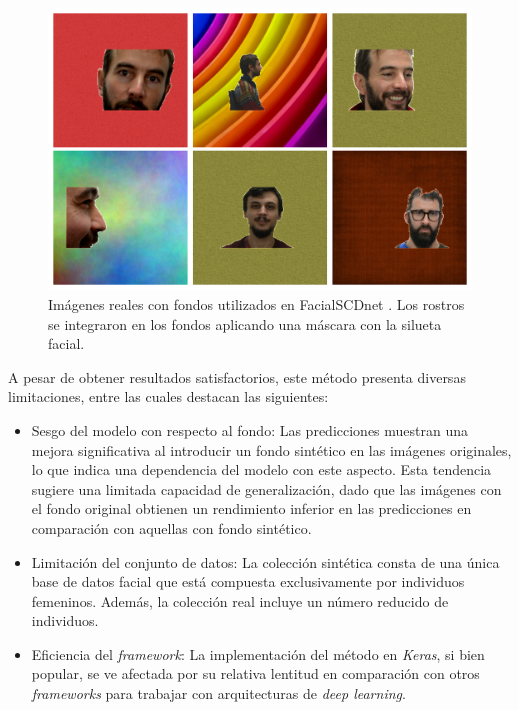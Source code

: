 \begin{figure}[h]
	\centering
	\includegraphics[scale=0.3]{imagenes/cap4/figura_FSCDnet.png}
	\caption[Ejemplos de imágenes reales con fondos FacialSCDnet.]{Imágenes reales con fondos utilizados en FacialSCDnet \cite{14}. Los rostros se integraron en los fondos aplicando una máscara con la silueta facial.}
	\label{fig24.2}
\end{figure}

A pesar de obtener resultados satisfactorios, este método presenta diversas limitaciones, entre las cuales destacan las siguientes: 

\begin{itemize}
	\item Sesgo del modelo con respecto al fondo: Las predicciones muestran una mejora significativa al introducir un fondo sintético en las imágenes originales, lo que indica una dependencia del modelo con este aspecto. Esta tendencia sugiere una limitada capacidad de generalización, dado que las imágenes con el fondo original obtienen un rendimiento inferior en las predicciones en comparación con aquellas con fondo sintético.
	\item Limitación del conjunto de datos: La colección sintética consta de una única base de datos facial que está compuesta exclusivamente por individuos femeninos. Además, la colección real incluye un número reducido de individuos.
	\item Eficiencia del \textit{framework}: La implementación del método en \textit{Keras}, si bien popular, se ve afectada por su relativa lentitud en comparación con otros \textit{frameworks} para trabajar con arquitecturas de \textit{deep learning}.
\end{itemize}

